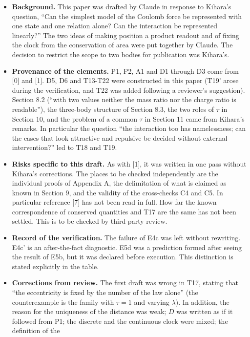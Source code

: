 \documentclass[
  a4paper,
]{article}
\providecommand{\tightlist}{%
  \setlength{\itemsep}{0pt}\setlength{\parskip}{0pt}}
\begin{document}
\begin{itemize}
\tightlist
\item
  \textbf{Background.} This paper was drafted by Claude in response to
  Kihara's question, ``Can the simplest model of the Coulomb force be
  represented with one state and one relation alone? Can the interaction
  be represented linearly?'' The two ideas of making position a product
  readout and of fixing the clock from the conservation of area were put
  together by Claude. The decision to restrict the scope to two bodies
  for publication was Kihara's.
\item
  \textbf{Provenance of the elements.} P1, P2, A1 and D1 through D3 come
  from {[}0{]} and {[}1{]}. D5, D6 and T13-T22 were constructed in this
  paper (T19' arose during the verification, and T22 was added following
  a reviewer's suggestion). Section 8.2 (``with two values neither the
  mass ratio nor the charge ratio is readable''), the three-body
  structure of Section 8.3, the two roles of \(\tau\) in Section 10, and
  the problem of a common \(\tau\) in Section 11 came from Kihara's
  remarks. In particular the question ``the interaction too has
  namelessness; can the cases that look attractive and repulsive be
  decided without external intervention?'' led to T18 and T19.
\item
  \textbf{Risks specific to this draft.} As with {[}1{]}, it was written
  in one pass without Kihara's corrections. The places to be checked
  independently are the individual proofs of Appendix A, the
  delimitation of what is claimed as known in Section 9, and the
  validity of the cross-checks C4 and C5. In particular reference
  {[}7{]} has not been read in full. How far the known correspondence of
  conserved quantities and T17 are the same has not been settled. This
  is to be checked by third-party review.
\item
  \textbf{Record of the verification.} The failure of E4c was left
  without rewriting. E4c' is an after-the-fact diagnostic. E5d was a
  prediction formed after seeing the result of E5b, but it was declared
  before execution. This distinction is stated explicitly in the table.
\item
  \textbf{Corrections from review.} The first draft was wrong in T17,
  stating that ``the eccentricity is fixed by the number of the law
  alone'' (the counterexample is the family with \(\tau=1\) and varying
  \(\lambda\)). In addition, the reason for the uniqueness of the
  distance was weak; \(D\) was written as if it followed from P1; the
  discrete and the continuous clock were mixed; the definition of the

\end{itemize}
\end{document}
